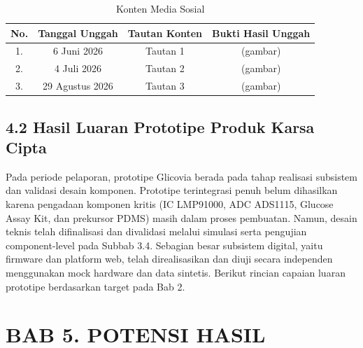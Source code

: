 \documentclass[12pt,a4paper]{article}
\begin{document}
\begin{table}[htbp]
\centering
\caption{Konten Media Sosial}
\label{tab:konten_medsos}
\begin{tabular}{|c|c|c|c|}
\hline
\textbf{No.} & \textbf{Tanggal Unggah} & \textbf{Tautan Konten} & \textbf{Bukti Hasil Unggah} \\ \hline
1. & 6 Juni 2026 & Tautan 1 & (gambar) \\ \hline
2. & 4 Juli 2026 & Tautan 2 & (gambar) \\ \hline
3. & 29 Agustus 2026 & Tautan 3 & (gambar) \\ \hline
\end{tabular}
\end{table}

\subsection*{4.2 Hasil Luaran Prototipe Produk Karsa Cipta}
Pada periode pelaporan, prototipe Glicovia berada pada tahap realisasi subsistem dan validasi desain komponen. Prototipe terintegrasi penuh belum dihasilkan karena pengadaan komponen kritis (IC LMP91000, ADC ADS1115, Glucose Assay Kit, dan prekursor PDMS) masih dalam proses pembuatan. Namun, desain teknis telah difinalisasi dan divalidasi melalui simulasi serta pengujian component-level pada Subbab 3.4. Sebagian besar subsistem digital, yaitu firmware dan platform web, telah direalisasikan dan diuji secara independen menggunakan mock hardware dan data sintetis. Berikut rincian capaian luaran prototipe berdasarkan target pada Bab 2.

\section*{BAB 5. POTENSI HASIL}
\end{document}
